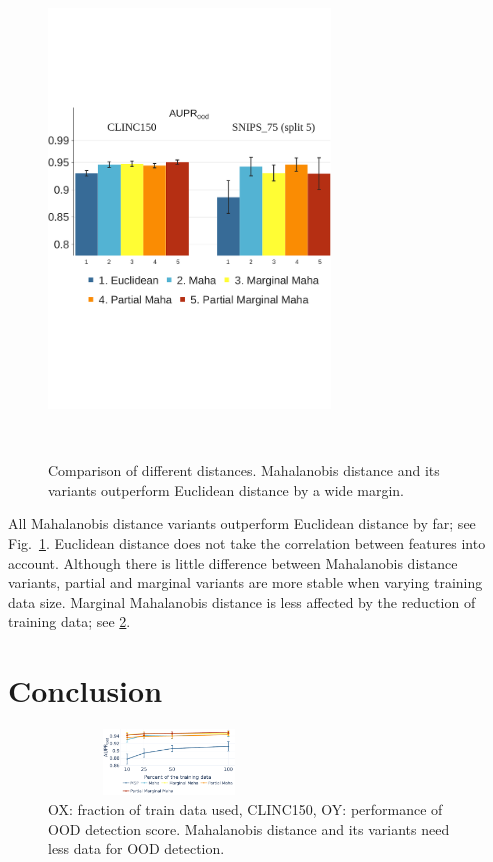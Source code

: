 \documentclass[letterpaper, final]{article} %
\begin{document}
\begin{figure}[ht]
\centering

\begin{subfloat}
\centering\includegraphics[width=7.5cm]{images/roberta_aupr_clinc_snips}
\caption*{}
\end{subfloat}
\leavevmode\\[-8ex]

\caption{Comparison of different distances. Mahalanobis distance and its variants outperform Euclidean distance by a wide margin.}
\label{fig:maha_var_comp}
\end{figure}

All Mahalanobis distance variants outperform Euclidean distance by far; see Fig.~\ref{fig:maha_var_comp}. Euclidean distance does not take the correlation between features into account. Although there is little difference between Mahalanobis distance variants, partial and marginal variants are more stable when varying training data size.  Marginal Mahalanobis distance is less affected by the reduction of training data; see \ref{fig:dataset_size_var}.









\section{Conclusion}
\begin{figure}[t]
\centering
\includegraphics[width=6.4cm, keepaspectratio,height=0.69in ]{aupr_clinc_diff_sizes.pdf}
\caption{OX: fraction of train data used, CLINC150, OY: performance of OOD detection score. Mahalanobis distance and its variants need less data for OOD detection.}
\label{fig:dataset_size_var}
\end{figure}
\end{document}
